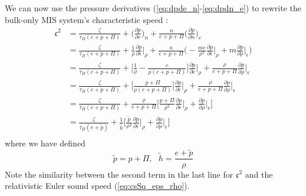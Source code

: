 \documentclass[12pt]{article}
\numberwithin{equation}{section}
\begin{document}
We can now use the pressure derivatives (\ref{eq:dpde_n}-\ref{eq:dpdn_e}) to rewrite the bulk-only MIS system's characteristic speed \cite{Bemfica19}:
\begin{equation}
\begin{aligned}
\mathfrak{c}^2 &= \frac{\zeta}{\tau_{\Pi} (e + p + \Pi)} + \Big( \frac{\partial p}{\partial e} \Big)_n + \frac{n}{e+p+\Pi} \Big( \frac{\partial p}{\partial n} \Big)_e \\
&= \frac{\zeta}{\tau_{\Pi} (e + p + \Pi)} + \frac{1}{\rho} \frac{\partial p}{\partial \epsilon} \Big|_\rho + \frac{n}{e+p+\Pi} \Big( -\frac{m e}{\rho^2} \frac{\partial p}{\partial \epsilon} \Big|_\rho + m \frac{\partial p}{\partial \rho} \Big|_\epsilon \Big) \\
&= \frac{\zeta}{\tau_{\Pi} (e + p + \Pi)} + \Big[ \frac{1}{\rho} - \frac{e}{\rho (e+p+\Pi)} \Big] \frac{\partial p}{\partial \epsilon} \Big|_\rho + \frac{\rho}{e+p+\Pi} \frac{\partial p}{\partial \rho} \Big|_\epsilon \\
&= \frac{\zeta}{\tau_{\Pi} (e + p + \Pi)} + \Big[ \frac{p + \Pi}{\rho (e+p+\Pi)} \Big] \frac{\partial p}{\partial \epsilon} \Big|_\rho + \frac{\rho}{e+p+\Pi} \frac{\partial p}{\partial \rho} \Big|_\epsilon \\
&= \frac{\zeta}{\tau_{\Pi} (e + p + \Pi)} + \frac{\rho}{e+p+\Pi} \Big[ \frac{p + \Pi}{\rho^2} \frac{\partial p}{\partial \epsilon} \Big|_\rho + \frac{\partial p}{\partial \rho} \Big|_\epsilon \Big] \\
&= \frac{\zeta}{\tau_{\Pi} (e + \tilde{p})} + \frac{1}{\tilde{h}} \Big[ \frac{\tilde{p}}{\rho^2} \frac{\partial p}{\partial \epsilon} \Big|_\rho + \frac{\partial p}{\partial \rho} \Big|_\epsilon \Big] \\
\end{aligned}
\end{equation}
where we have defined
\begin{equation}
\tilde{p} = p + \Pi, ~~~ \tilde{h} = \frac{e + \tilde{p}}{\rho}
\end{equation}
Note the similarity between the second term in the last line for $\mathfrak{c}^2$ and the relativistic Euler sound speed (\ref{eq:csSq_eps_rho}).
\end{document}

